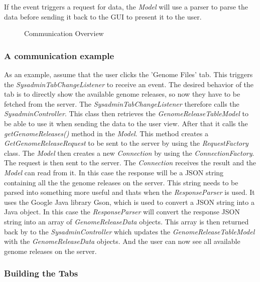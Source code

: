 If the event triggers a request for data, the \textit{Model} will use a parser to parse the data before sending it back to the GUI to present it to the user.


\begin{figure}[hbt!]
\caption{Communication Overview}
\label{fig:adm_com_view}
\end{figure}


\subsubsection{A communication example}
\label{Communication example}

As an example, assume that the user clicks the 'Genome Files' tab.
This triggers the \textit{SysadminTabChangeListener} to receive an event. The desired behavior of the tab is to directly show the available genome releases, so now they  have to be fetched from the server. The \textit{SysadminTabChangeListener} therefore calls the \textit{SysadminController}.
This class then retrieves the \textit{GenomeReleaseTableModel} to be able to use it when sending the data to the user view.  After that it calls the \textit{getGenomeReleases()} method in the \textit{Model}. This method creates a \textit{GetGenomeReleaseRequest} to be sent to the server by using the \textit{RequestFactory} class. The \textit{Model} then creates a new \textit{Connection} by using the \textit{ConnectionFactory}. The request is then sent to the server. The \textit{Connection} receives the result and the \textit{Model} can read from it. In this case the response will be a JSON string containing all the the genome releases on the server. This string needs to be parsed into something more useful and thats when the \textit{ResponseParser} is used. It uses the Google Java library Gson, which is used to convert a JSON string into a Java object. In this case the \textit{ResponseParser} will convert the response JSON string into an array of \textit{GenomeReleaseData} objects. This array is then returned back by to the \textit{SysadminController} which updates the \textit{GenomeReleaseTableModel} with the \textit{GenomeReleaseData} objects. And the user can now see all available genome releases on the server.

\subsubsection{Building the Tabs}
\label{Building the Tabs}

